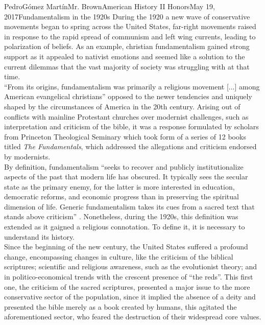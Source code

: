 \documentclass[12pt, letterpaper]{article}
\begin{document}
\begin{mla}{Pedro}{G\'{o}mez Mart\'{i}n}{Mr. Brown}{American History II Honors}{May 19, 2017}{Fundamentalism in the 1920s}
  During the 1920 a new wave of conservative movements began to spring across the United States, far-right movements raised in response to the rapid spread of communism and left wing currents, leading to polarization of beliefs. As an example, christian fundamentalism gained strong support as it appealed to nativist emotions and seemed like a solution to the current dilemmas that the vast majority of society was struggling with at that time.\\
  “From its origins, fundamentalism was primarily a religious movement [...] among American evangelical christians”\parencite{fundamentalism1} opposed to the newer tendencies and uniquely shaped by the circumstances of America in the 20th century. Arising out of conflicts with mainline Protestant churches over modernist challenges, such as interpretation and criticism of the bible, it was a response formulated by scholars from Princeton Theological Seminary which took form of a series of 12 books titled \textit{The Fundamentals}, which addressed the allegations and criticism endorsed by modernists.\parencite{ChristianFundamentalism}\\ 
  By definition, fundamentalism “seeks to recover and publicly institutionalize aspects of the past that modern life has obscured. It typically sees the secular state as the primary enemy, for the latter is more interested in education, democratic reforms, and economic progress than in preserving the spiritual dimension of life. Generic fundamentalism takes its cues from a sacred text that stands above criticism” \parencite{RiseFundamentalism}. Nonetheless, during the 1920s, this definition was extended as it gaigned a religious connotation. To define it, it is necessary to understand its history.\\
  Since the beginning of the new century, the United States suffered a profound change, encompassing changes in culture, like the criticism of the biblical scriptures; scientific and religious awareness, such as the evolutionist theory; and in politico-economical trends with the crescent presence of “the reds”. This first one, the criticism of the sacred scriptures, presented a major issue to the more conservative sector of the population, since it implied the absence of a deity and presented the bible merely as a book created by humans, this agitated the aforementioned sector, who feared the destruction of their widespread core values.\\

\end{mla}
\end{document}
